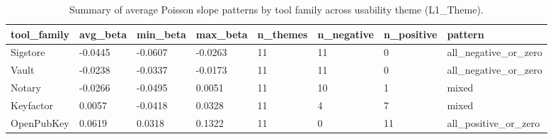 \begin{table}[t]
\centering
\caption{Summary of average Poisson slope patterns by tool family across usability theme (L1_Theme).}
\label{tab:poisson-avg-beta-tool-l1-theme-summary}
\scriptsize
\begin{tabular}{llllllll}
\hline
tool\_family & avg\_beta & min\_beta & max\_beta & n\_themes & n\_negative & n\_positive & pattern \\
\hline
Sigstore & -0.0445 & -0.0607 & -0.0263 & 11 & 11 & 0 & all\_negative\_or\_zero \\
Vault & -0.0238 & -0.0337 & -0.0173 & 11 & 11 & 0 & all\_negative\_or\_zero \\
Notary & -0.0266 & -0.0495 & 0.0051 & 11 & 10 & 1 & mixed \\
Keyfactor & 0.0057 & -0.0418 & 0.0328 & 11 & 4 & 7 & mixed \\
OpenPubKey & 0.0619 & 0.0318 & 0.1322 & 11 & 0 & 11 & all\_positive\_or\_zero \\
\hline
\end{tabular}
\end{table}
